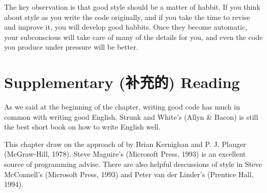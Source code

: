 The key observation is that good style should be a matter of habbit. If you
think about style as you write the code originally, and if you take the
time to revise and improve it, you will develop good habbits. Once they
become automatic, your subconscious will take care of many of the details
for you, and even the code you produce under pressure will be better.

\section*{Supplementary (补充的) Reading}
As we said at the beginning of the chapter, writing good code has much in
common with writing good English. Strunk and White's  (Allyn \& Bacon) is still the best short book on how to write
English well.

This chapter draw on the approach of  by Brian Kernighan and P. J. Plauger (McGraw-Hill, 1978). Steve
Maguire's  (Microsoft Press, 1993) is an
excellent source of programming advise. There are also helpful descussions
of style in Steve McConnell's  (Microsoft Press,
1993) and Peter van der Linder's  (Prentice Hall, 1994).
